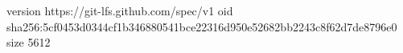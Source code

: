 version https://git-lfs.github.com/spec/v1
oid sha256:5cf0453d0344cf1b346880541bce22316d950e52682bb2243c8f62d7de8796e0
size 5612
